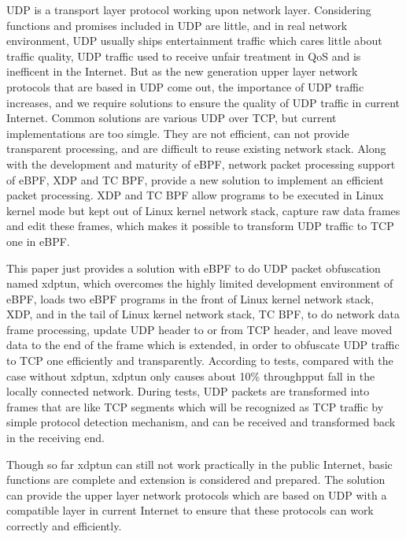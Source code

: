 \begin{abstract*}
  UDP is a transport layer protocol working upon network layer.
  Considering functions and promises included in UDP are little, and in real network environment, UDP usually ships entertainment traffic which cares little about traffic quality, UDP traffic used to receive unfair treatment in QoS and is inefficent in the Internet.
  But as the new generation upper layer network protocols that are based in UDP come out, the importance of UDP traffic increases, and we require solutions to ensure the quality of UDP traffic in current Internet.
  Common solutions are various UDP over TCP, but current implementations are too simgle. They are not efficient, can not provide transparent processing, and are difficult to reuse existing network stack.
  Along with the development and maturity of eBPF, network packet processing support of eBPF, XDP and TC BPF, provide a new solution to implement an efficient packet processing.
  XDP and TC BPF allow programs to be executed in Linux kernel mode but kept out of Linux kernel network stack, capture raw data frames and edit these frames, which makes it possible to transform UDP traffic to TCP one in eBPF.

  This paper just provides a solution with eBPF to do UDP packet obfuscation named xdptun, which overcomes the highly limited development environment of eBPF, loads two eBPF programs in the front of Linux kernel network stack, XDP, and in the tail of Linux kernel network stack, TC BPF, to do network data frame processing, update UDP header to or from TCP header, and leave moved data to the end of the frame which is extended, in order to obfuscate UDP traffic to TCP one efficiently and transparently.
  According to tests, compared with the case without xdptun, xdptun only causes about 10\% throughpput fall in the locally connected network.
  During tests, UDP packets are transformed into frames that are like TCP segments which will be recognized as TCP traffic by simple protocol detection mechanism, and can be received and transformed back in the receiving end.

  Though so far xdptun can still not work practically in the public Internet, basic functions are complete and extension is considered and prepared.
  The solution can provide the upper layer network protocols which are based on UDP with a compatible layer in current Internet to ensure that these protocols can work correctly and efficiently.
\end{abstract*}
